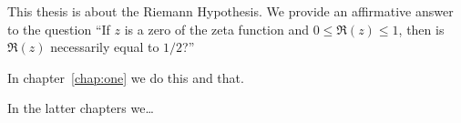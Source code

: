 %
This thesis is about the Riemann Hypothesis. We provide an
affirmative answer to the question ``If $z$ is a zero of the
zeta function and $0\le \Re(z)\le1$, then is $\Re(z)$
necessarily equal to $1/2$?''

In chapter~\ref{chap:one} we do this and that.

In the latter chapters we\ldots

\citet{Foreman-Mackey:2013}
